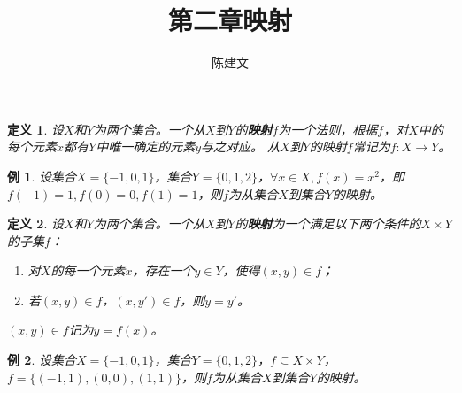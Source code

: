 \documentclass{article}
\newtheorem{Def}{定义}
\newtheorem*{Example}{例}
\begin{document}
\begin{CJK*}{UTF8}{gbsn}
  \title{第二章映射}
  \author{陈建文}
  \maketitle
  

  \begin{Def}
    设$X$和$Y$为两个集合。一个从$X$到$Y$的{\bfseries 映射}$f$为一个法则，根据$f$，对$X$中的每个元素$x$都有$Y$中唯一确定的元素$y$与之对应。
    从$X$到$Y$的映射$f$常记为$f:X\to Y$。
  \end{Def}

  \begin{Example}
    设集合$X=\{-1,0,1\}$，集合$Y=\{0,1,2\}$，$\forall x \in X, f(x)=x^2$，即$f(-1)=1,f(0)=0,f(1)=1$，则$f$为从集合$X$到集合$Y$的映射。
  \end{Example}

  
  \begin{Def}
    设$X$和$Y$为两个集合。一个从$X$到$Y$的{\bfseries 映射}为一个满足以下两个条件的$X\times Y$的子集$f$：
    \begin{enumerate}
    \item 对$X$的每一个元素$x$，存在一个$y\in Y$，使得$(x,y) \in f$；
    \item 若$(x,y)\in f$，$(x,y')\in f$，则$y=y'$。
    \end{enumerate}
    $(x,y)\in f$记为$y=f(x)$。
  \end{Def}
  \begin{Example}
    设集合$X=\{-1,0,1\}$，集合$Y=\{0,1,2\}$，$f\subseteq X \times Y$，$f=\{(-1,1),(0,0),(1,1)\}$，则$f$为从集合$X$到集合$Y$的映射。
  \end{Example}


\end{CJK*}
\end{document}
